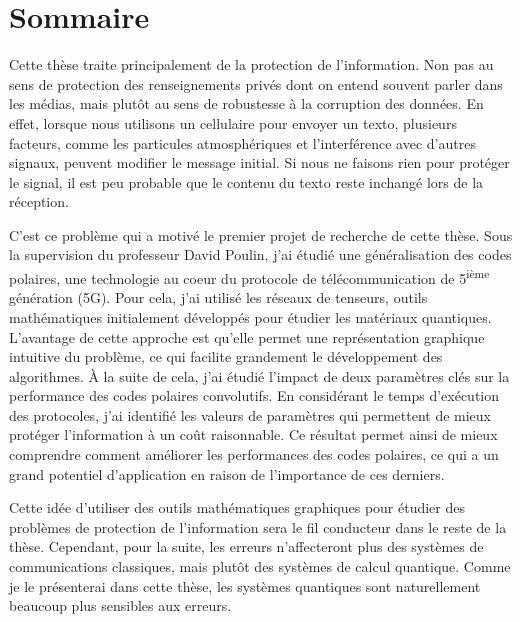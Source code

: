 \begin{comment}
\end{comment}

\clearpage  %
\chapter*{Sommaire}

Cette thèse traite principalement de la protection de l'information. Non pas au
sens de protection des renseignements privés dont on entend souvent parler
dans les médias,
mais plutôt au sens de robustesse à la corruption des données.
En effet, lorsque nous utilisons un cellulaire pour envoyer un texto, plusieurs
facteurs, comme les particules atmosphériques et l'interférence avec d'autres
signaux, peuvent modifier le message initial. Si nous ne faisons rien pour protéger le signal, 
il est peu probable que le contenu du texto reste inchangé lors de la réception.

C'est ce problème qui a motivé le premier projet de recherche de cette thèse.
Sous la supervision du professeur David Poulin, 
j'ai étudié une généralisation des codes polaires,
une technologie au coeur du protocole de télécommunication de 5\textsuperscript{ième} génération (5G). 
Pour cela, j'ai utilisé les réseaux de tenseurs, outils
mathématiques initialement développés pour étudier les matériaux quantiques.
L'avantage de cette approche est qu'elle permet une représentation graphique
intuitive du problème, ce qui facilite grandement le développement des algorithmes.
À la suite de cela,
j'ai étudié l'impact de deux paramètres clés sur la performance des 
codes polaires convolutifs.
En considérant le temps d'exécution des protocoles,
j'ai identifié les valeurs de paramètres qui permettent de mieux protéger 
l'information à un coût raisonnable.
Ce résultat permet ainsi de mieux comprendre comment améliorer les performances
des codes polaires, ce qui a un grand potentiel d'application en raison
de l'importance de ces derniers.

Cette idée d'utiliser des outils mathématiques graphiques pour étudier des
problèmes de protection de l'information sera le fil conducteur dans le reste de
la thèse. Cependant, pour la suite, les erreurs n'affecteront plus des systèmes
de communications classiques, mais plutôt des systèmes de calcul quantique.
Comme je le présenterai dans cette thèse, les systèmes quantiques sont
naturellement beaucoup plus sensibles aux erreurs.

